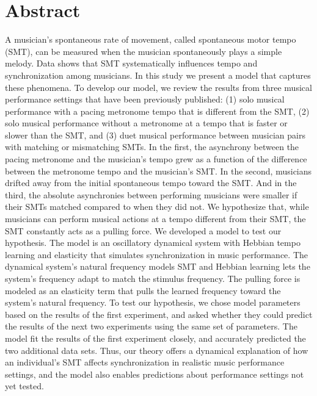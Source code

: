 \documentclass[10pt,letterpaper]{article}
\begin{document}
\section*{Abstract}
A musician’s spontaneous rate of movement, called spontaneous motor tempo (SMT), can be measured when the musician spontaneously plays a simple melody. Data shows that SMT systematically influences tempo and synchronization among musicians. In this study we present a model that captures these phenomena. To develop our model, we review the results from three musical performance settings that have been previously published: (1) solo musical performance with a pacing metronome tempo that is different from the SMT, (2) solo musical performance without a metronome at a tempo that is faster or slower than the SMT, and (3) duet musical performance between musician pairs with matching or mismatching SMTs. In the first, the asynchrony between the pacing metronome and the musician's tempo grew as a function of the difference between the metronome tempo and the musician's SMT. In the second, musicians drifted away from the initial spontaneous tempo toward the SMT. And in the third, the absolute asynchronies between performing musicians were smaller if their SMTs matched compared to when they did not. We hypothesize that, while musicians can perform musical actions at a tempo different from their SMT, the SMT constantly acts as a pulling force. We developed a model to test our hypothesis. The model is an oscillatory dynamical system with Hebbian tempo learning and elasticity that simulates synchronization in music performance. The dynamical system's natural frequency models SMT and Hebbian learning lets the system's frequency adapt to match the stimulus frequency. The pulling force is modeled as an elasticity term that pulls the learned frequency toward the system's natural frequency. To test our hypothesis,  we chose model parameters based on the results of the first experiment, and asked whether they could predict the results of the next two experiments using the same set of parameters. The model fit the results of the first experiment closely, and accurately predicted the two additional data sets. Thus, our theory offers a dynamical explanation of how an individual's SMT affects synchronization in realistic music performance settings, and the model also enables predictions about performance settings not yet tested. 


\end{document}
